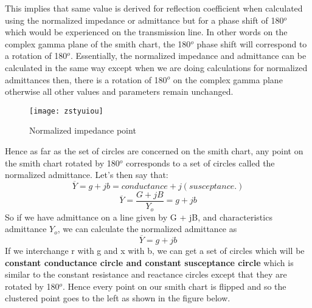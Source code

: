  This implies that same value is derived for reflection coefficient when calculated using the normalized impedance or admittance but for a phase shift of 180$^o$ which would be experienced on the transmission line. In other words on the complex gamma plane of the smith chart, the 180$^o$ phase shift will correspond to a rotation of 180$^o$. Essentially, the normalized impedance and admittance can be calculated in the same way except when we are doing calculations for normalized admittances then, there is a rotation of 180$^o$ on the complex gamma plane otherwise all other values and parameters remain unchanged.
 \begin{figure}[h]
 	\centering
 	\texttt{[image: zstyuiou]}
 	\caption{Normalized impedance point}
 	\label{fig:zstyuiou}
 \end{figure}
 

 Hence as far as the set of circles are concerned on the smith chart, any point on the smith chart rotated by 180$^o$ corresponds to a set of circles called the normalized admittance. Let's then say that:
 \begin{equation*}
 \overline{Y} = g + jb = conductance + j(susceptance.)
 \end{equation*}
 \begin{equation*}
 \overline{Y}=\frac{G + jB}{Y_o} = g + jb
 \end{equation*}
 So if we have admittance on a line given by G + jB, and characteristics admittance $Y_o$, we can calculate the normalized admittance as 
 \begin{equation*}
 \overline{Y} = g + jb
 \end{equation*}
 If we interchange r with g and x with b, we can get a set of circles which will be \textbf{constant conductance circle and constant susceptance circle} which is similar to the constant resistance and reactance circles except that they are rotated by 180$^o$. Hence every point on our smith chart is flipped and so the clustered point goes to the left as shown in the figure below.\\

